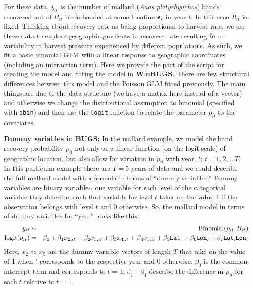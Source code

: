 For these data, $y_{it}$ is the number of mallard ({\it Anas platyrhynchos}) bands recovered out
of $B_{it}$ birds banded at some location ${\bf s}_{i}$ in year $t$. In this case $B_{it}$ is
fixed. Thinking about recovery rate as being proportional to harvest
rate, we use these data to explore geographic gradients in recovery rate
resulting from variability in harvest pressure experienced by different
populations. 
As such, we fit a
basic binomial GLM with a linear response to geographic coordinates
(including an interaction term). 
Here we
 provide the part of the script for creating the model and fitting the
 model in
{\bf WinBUGS}.
There are few structural differences between this model and the
Poisson GLM fitted previously. The main things are due to the data
structure (we have a matrix here instead of a vector) and otherwise we
change the  distributional assumption to binomial (specified with
\mbox{\tt dbin}) and then use the \mbox{\tt logit} function to relate
the parameter $p_{it}$ to the covariates.  

{\flushleft \bf Dummy variables in BUGS: }
In the mallard example, we model the band
recovery probability $p_{it}$ not only as a linear function (on the logit
scale) of geographic location, but also allow for variation in $p_{it}$
with year, $t$; $t=1,2,...T$. In this particular example there are
$T=5$ years of data and we could describe the full mallard
model with a formula in terms of ``dummy variables.'' Dummy variables
are binary
variables, one variable for each level of the categorical variable
they describe, such that variable for level $t$ takes on the value 1
if the observation belongs with level $t$ and 0 otherwise. So, the
mallard model in terms of dummy variables for ``year'' looks like this:
\begin{eqnarray*}
y_{it} &\sim & \mbox{Binomial}(p_{it}, B_{it}) \\
\mbox{logit}(p_{it}) &=& \beta_0 + \beta_1 x_{2,it}+ \beta_2 x_{3,it} +
\beta_3 x_{4,it} + \beta_4 x_{5,it} + 
\beta_5 \mbox{\tt Lat}_i + \beta_6 \mbox{\tt Lon}_i + \beta_7
\mbox{\tt Lat}_i \mbox{\tt Lon}_i
\end{eqnarray*}
Here, $x_{2}$ to $x_{5}$ are the dummy variable vectors of length $T$
that take on the value of 1 when $t$ corresponds to the respective
year and 0 otherwise; $\beta_0$ is the common intercept term and
corresponds to $t=1$; $\beta_1$ - $\beta_4$ describe the difference in
$p_{it}$ for each $t$ relative to $t=1$.

